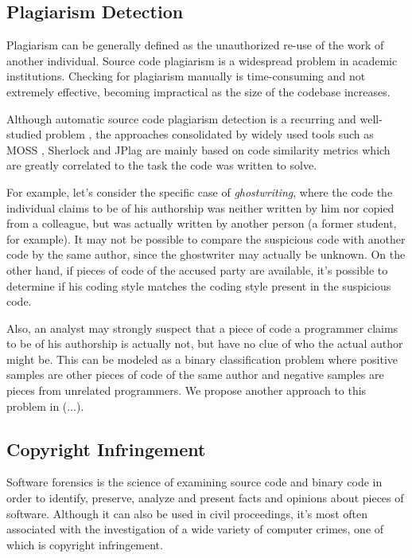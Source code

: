 \subsection{Plagiarism Detection}

Plagiarism can be generally defined as the unauthorized re-use of the work of another individual. Source code plagiarism is a widespread problem in academic institutions. Checking for plagiarism manually is time-consuming and not extremely effective, becoming impractical as the size of the codebase increases.

Although automatic source code plagiarism detection is a recurring and well-studied problem \cite{plag_survey}, the approaches consolidated by widely used tools such as MOSS \cite{moss}, Sherlock and JPlag \cite{jplag} are mainly based on code similarity metrics which are greatly correlated to the task the code was written to solve.%

For example, let's consider the specific case of \textit{ghostwriting}, where the code the individual claims to be of his authorship was neither written by him nor copied from a colleague, but was actually written by another person (a former student, for example).  It may not be possible to compare the suspicious code with another code by the same author, since the ghostwriter may actually be unknown. On the other hand, if pieces of code of the accused party are available, it's possible to determine if his coding style matches the coding style present in the suspicious code.

Also, an analyst may strongly suspect that a piece of code a programmer claims to be of his authorship is actually not, but have no clue of who the actual author might be. This can be modeled as a binary classification problem where positive samples are other pieces of code of the same author and negative samples are pieces from unrelated programmers. We propose another approach to this problem in (...).

\subsection{Copyright Infringement}

Software forensics is the science of examining source code and binary code in order to identify, preserve, analyze and present facts and opinions about pieces of software. Although it can also be used in civil proceedings, it's most often associated with the investigation of a wide variety of computer crimes, one of which is copyright infringement.

